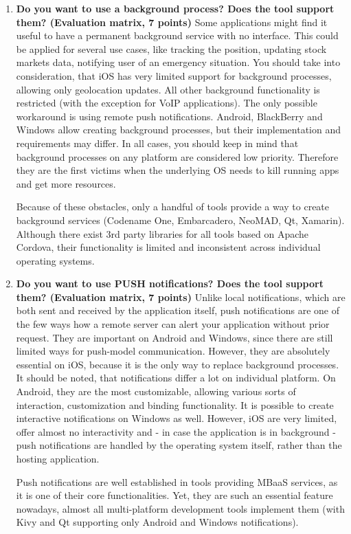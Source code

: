 \documentclass[english,master,public,dept460,male,cpdeclaration,oneside]{diploma}
\begin{document}
\begin{enumerate}
	\item \textbf{Do you want to use a background process? Does the tool support them? (Evaluation matrix, 7 points) }
	Some applications might find it useful to have a permanent background service with no interface. This could be applied for several use cases, like tracking the position, updating stock markets data, notifying user of an emergency situation. You should take into consideration, that iOS has very limited support for background processes, allowing only geolocation updates. All other background functionality is restricted (with the exception for VoIP applications). The only possible workaround is using remote push notifications. Android, BlackBerry and Windows allow creating background processes, but their implementation and requirements may differ. In all cases, you should keep in mind that background processes on any platform are considered low priority. Therefore they are the first victims when the underlying OS needs to kill running apps and get more resources.
	
	Because of these obstacles, only a handful of tools provide a way to create background services (Codename One, Embarcadero, NeoMAD, Qt, Xamarin). Although there exist 3rd party libraries for all tools based on Apache Cordova, their functionality is limited and inconsistent across individual operating systems.
	
	\item \textbf{Do you want to use PUSH notifications? Does the tool support them? (Evaluation matrix, 7 points) }
	Unlike local notifications, which are both sent and received by the application itself, push notifications are one of the few ways how a remote server can alert your application without prior request. They are important on Android and Windows, since there are still limited ways for push-model communication. However, they are absolutely essential on iOS, because it is the only way to replace background processes. It should be noted, that notifications differ a lot on individual platform. On Android, they are the most customizable, allowing various sorts of interaction, customization and binding functionality. It is possible to create interactive notifications on Windows as well. However, iOS are very limited, offer almost no interactivity and - in case the application is in background - push notifications are handled by the operating system itself, rather than the hosting application. 
	
	Push notifications are well established in tools providing MBaaS services, as it is one of their core functionalities. Yet, they are such an essential feature nowadays, almost all multi-platform development tools implement them (with Kivy and Qt supporting only Android and Windows notifications).
	

\end{enumerate}
\end{document}
